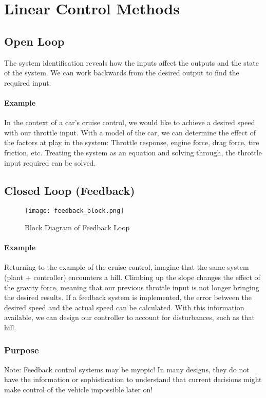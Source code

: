 \documentclass[../notes.tex]{subfiles}
\begin{document}
\section{Linear Control Methods}
\subsection{Open Loop}
The system identification reveals how the inputs affect the outputs and the state of the system. We can work backwards from the desired output to find the required input. 
\paragraph{Example} In the context of a car's cruise control, we would like to achieve a desired speed with our throttle input. With a model of the car, we can determine the effect of the factors at play in the system: Throttle response, engine force, drag force, tire friction, etc. Treating the system as an equation and solving through, the throttle input required can be solved.
\subsection{Closed Loop (Feedback)}
\begin{figure}[H]
    \centering
    \texttt{[image: feedback\_block.png]}
    \caption{Block Diagram of Feedback Loop}
    \label{fig:feedbackBlock}
\end{figure}
\paragraph{Example} Returning to the example of the cruise control, imagine that the same system (plant + controller) encounters a hill. Climbing up the slope changes the effect of the gravity force, meaning that our previous throttle input is not longer bringing the desired results. If a feedback system is implemented, the error between the desired speed and the actual speed can be calculated. With this information available, we can design our controller to account for disturbances, such as that hill.
\subsubsection{Purpose}
\begin{emphasis} \label{sec:feedbackMyopia}
   $\boxed{\text{Note:}}$ Feedback control systems may be myopic! In many designs, they do not have the information or sophistication to understand that current decisions might make control of the vehicle impossible later on!
\end{emphasis}
\end{document}
